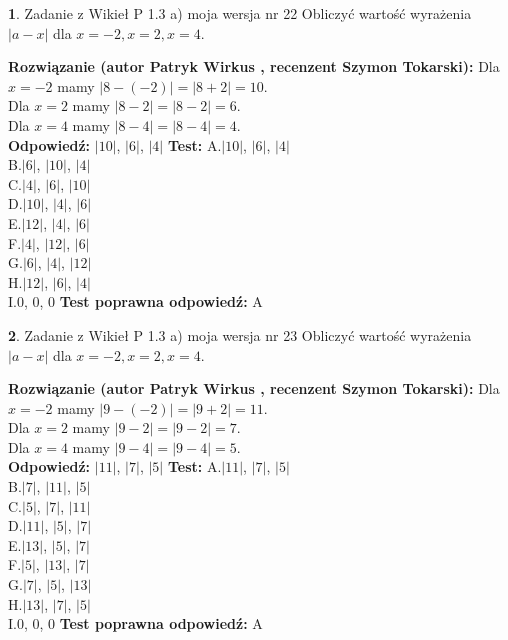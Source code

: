 \documentclass[12pt, a4paper]{article}
\theoremstyle{definition} %
\newtheorem{zad}{}
\newcommand{\zadStart}[1]{\begin{zad}#1\newline}
\newcommand{\zadStop}{\end{zad}}
\newcommand{\rozwStart}[2]{\noindent \textbf{Rozwiązanie (autor #1 , recenzent #2): }\newline}
\newcommand{\rozwStop}{\newline}
\newcommand{\odpStart}{\noindent \textbf{Odpowiedź:}\newline}
\newcommand{\odpStop}{\newline}
\newcommand{\testStart}{\noindent \textbf{Test:}\newline}
\newcommand{\testStop}{\newline}
\newcommand{\kluczStart}{\noindent \textbf{Test poprawna odpowiedź:}\newline}
\newcommand{\kluczStop}{\newline}
\begin{document}
\zadStart{Zadanie z Wikieł P 1.3 a) moja wersja nr 22}
Obliczyć wartość wyrażenia $|a - x|$ dla $x=-2,x=2,x=4$.
\zadStop
\rozwStart{Patryk Wirkus}{Szymon Tokarski}
Dla $x = -2$ mamy $|8 - (-2)| = |8 + 2| = 10$.\\
Dla $x = 2$ mamy $|8 - 2| = |8 - 2| = 6$.\\
Dla $x = 4$ mamy $|8 - 4| = |8 - 4| = 4$.\\
\rozwStop
\odpStart
$|10|$, $|6|$, $|4|$
\odpStop
\testStart
A.$|10|$, $|6|$, $|4|$\\
B.$|6|$, $|10|$, $|4|$\\
C.$|4|$, $|6|$, $|10|$\\
D.$|10|$, $|4|$, $|6|$\\
E.$|12|$, $|4|$, $|6|$\\
F.$|4|$, $|12|$, $|6|$\\
G.$|6|$, $|4|$, $|12|$\\
H.$|12|$, $|6|$, $|4|$\\
I.$0$, $0$, $0$
\testStop
\kluczStart
A
\kluczStop



\zadStart{Zadanie z Wikieł P 1.3 a) moja wersja nr 23}
Obliczyć wartość wyrażenia $|a - x|$ dla $x=-2,x=2,x=4$.
\zadStop
\rozwStart{Patryk Wirkus}{Szymon Tokarski}
Dla $x = -2$ mamy $|9 - (-2)| = |9 + 2| = 11$.\\
Dla $x = 2$ mamy $|9 - 2| = |9 - 2| = 7$.\\
Dla $x = 4$ mamy $|9 - 4| = |9 - 4| = 5$.\\
\rozwStop
\odpStart
$|11|$, $|7|$, $|5|$
\odpStop
\testStart
A.$|11|$, $|7|$, $|5|$\\
B.$|7|$, $|11|$, $|5|$\\
C.$|5|$, $|7|$, $|11|$\\
D.$|11|$, $|5|$, $|7|$\\
E.$|13|$, $|5|$, $|7|$\\
F.$|5|$, $|13|$, $|7|$\\
G.$|7|$, $|5|$, $|13|$\\
H.$|13|$, $|7|$, $|5|$\\
I.$0$, $0$, $0$
\testStop
\kluczStart
A
\kluczStop
\end{document}
